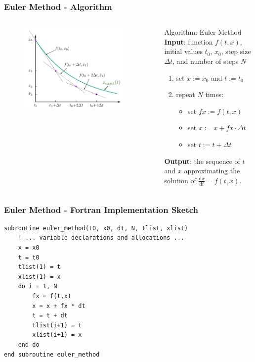 \documentclass[11pt,aspectratio=169,handout]{beamer}
\newcommand{\dif}[3][]{\frac{\mathrm{d}^{#1}#3}{\mathrm{d}{#2}^{#1}}}
\begin{document}
\begin{frame}
\frametitle{Euler Method - Algorithm}
\begin{columns}
\begin{figure}
	\centering
	\includegraphics[width=0.9\textwidth]{fig/diffeq-euler}
\end{figure}%
\begin{block}{Algorithm: Euler Method}
	\pause
	\textbf{Input}: function $f(t,x)$, initial values $t_0$, $x_0$, step size $\Delta t$, and number of steps $N$
	\pause
	\begin{enumerate}
		\item set $x := x_0$ and $t := t_0$
		\pause
		\item repeat $N$ times:
		\pause
		\begin{itemize}
			\item set $fx := f(t, x)$
			\pause
			\item set $x := x + fx \cdot \Delta t$
			\pause
			\item set $t := t + \Delta t$
		\end{itemize}		
	\end{enumerate}  
	\pause
	\textbf{Output}: the sequence of $t$ and $x$ approximating the solution of $\dif{t}{x} = f(t,x)$.
\end{block}
\end{columns}
\end{frame}

\begin{frame}[fragile]
\label{slide:euler-code}
\frametitle{Euler Method - Fortran Implementation Sketch}
\begin{lstlisting}	
subroutine euler_method(t0, x0, dt, N, tlist, xlist)
	! ... variable declarations and allocations ...
	x = x0
	t = t0
	tlist(1) = t
	xlist(1) = x         
	do i = 1, N
		fx = f(t,x)
		x = x + fx * dt
		t = t + dt
		tlist(i+1) = t
		xlist(i+1) = x
	end do
end subroutine euler_method

\end{lstlisting}
\end{frame}
\end{document}
